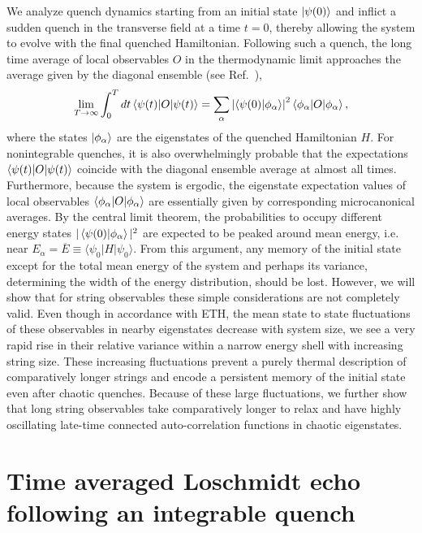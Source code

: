 \documentclass[aps,prx,twocolumn]{revtex4-2}
\begin{document}
 {We analyze quench dynamics starting from an initial state $\ket{\psi(0)}$ and inflict a sudden quench in the transverse field at a time $t=0$, thereby allowing the system to evolve with the final quenched Hamiltonian}.  {Following such a quench, the long time average of local observables $O$ in the thermodynamic limit approaches the average given by the diagonal ensemble (see Ref.~\cite{luca16})},
\begin{equation}\label{eq:de}
\lim\limits_{T\rightarrow\infty}\int_0^T dt\braket{\psi(t)|O|\psi(t)}=\sum\limits_{\alpha}\left|\braket{\psi(0)|\phi_{\alpha}}\right|^2\braket{\phi_{\alpha}|O|\phi_{\alpha}},
\end{equation}
where the states $\ket{\phi_{\alpha}}$ are the eigenstates of the quenched Hamiltonian $H$.  {For nonintegrable quenches, it is also overwhelmingly probable that the expectations $\braket{\psi(t)|O|\psi(t)}$ coincide with the diagonal ensemble average at almost all times. Furthermore, because the system is ergodic, the eigenstate expectation values of local observables $\braket{\phi_{\alpha}|O|\phi_{\alpha}}$ are essentially given by corresponding microcanonical averages}.  By the central limit theorem, the probabilities to occupy different energy states $|\braket{\psi(0)|\phi_{\alpha}}|^2$ are expected to be peaked around mean energy,  i.e. near $E_{\alpha}=\overline{E}\equiv \langle \psi_0 | H |\psi_0\rangle$.  From this argument, any memory of the initial state except for the total mean energy of the system and perhaps its variance, determining the width of the energy distribution, should be lost. However, we will show that for string observables these simple considerations are not completely valid. Even though in accordance with ETH, the mean state to state fluctuations of these observables in nearby eigenstates decrease with system size, we see a very rapid rise in their relative variance within a narrow energy shell with increasing string size. These increasing fluctuations prevent a purely thermal description of comparatively longer strings and encode a persistent memory of the initial state even after chaotic quenches. Because of these large fluctuations, we further show that long string observables take comparatively longer to relax and have highly oscillating late-time connected auto-correlation functions in chaotic eigenstates.



\section{Time averaged Loschmidt echo following an integrable quench}
\label{sec:lo_analytic}
\end{document}
